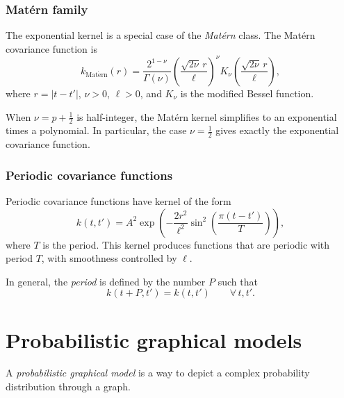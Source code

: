 \documentclass[11pt, titlepage]{article} %
\numberwithin{equation}{section}
\theoremstyle{definition}
\numberwithin{assumption}{section}
\begin{document}
\subsubsection*{Mat\'ern family}

The exponential kernel is a special case of the \textit{Mat\'ern} class. The Mat\'ern covariance function is
\begin{equation*}
    k_{\mathrm{Mat\acute ern}}(r)
    =
    \frac{2^{1-\nu}}{\Gamma(\nu)}
    \left(\frac{\sqrt{2\nu}\,r}{\ell}\right)^\nu
    K_\nu\!\left(\frac{\sqrt{2\nu}\,r}{\ell}\right),
\end{equation*}
where $r=|t-t'|$, $\nu>0$, $\ell>0$, and $K_\nu$ is the modified Bessel function.

When $\nu=p+\tfrac12$ is half-integer, the Mat\'ern kernel simplifies to an exponential times a polynomial. In particular, the case
    $\nu=\frac12$
gives exactly the exponential covariance function.

\subsubsection*{Periodic covariance functions}

Periodic covariance functions have kernel of the form
\begin{equation*}
    k(t,t')
    =
    A^2\exp\!\left(
    -\frac{2r^2}{\ell^2}\sin^2\!\left(\frac{\pi(t-t')}{T}\right)
    \right),
\end{equation*}
where $T$ is the period. This kernel produces functions that are periodic with period $T$, with smoothness controlled by $\ell$.

In general, the \textit{period} is defined by the number $P$ such that 
\begin{equation*}
    k(t+P,t') = k(t,t')\qquad\forall \, t,t'.
\end{equation*}

\section{Probabilistic graphical models}


A \textit{probabilistic graphical model} is a way to depict a complex probability distribution through a graph.
\end{document}
